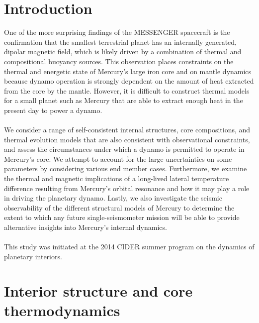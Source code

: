 \documentclass[landscape,a0b,final]{a0poster}
\begin{document}
\begin{multicols}{3}

\section*{Introduction}

One of the more surprising findings of the MESSENGER spacecraft is the confirmation that the smallest terrestrial planet has an internally generated, dipolar magnetic field, which is likely driven by a combination of thermal and compositional buoyancy sources. 
This observation places constraints on the thermal and energetic state of Mercury’s large iron core and on mantle dynamics because dynamo operation is strongly dependent on the amount of heat extracted from the core by the mantle.
However, it is difficult to construct thermal models for a small planet such as Mercury that are able to extract enough heat in the present day to power a dynamo. 
\\
\\
We consider a range of self-consistent internal structures, core compositions, and thermal evolution models that are also consistent with observational constraints, and assess the circumstances under which a dynamo is permitted to operate in Mercury’s core. 
We attempt to account for the large uncertainties on some parameters by considering various end member cases.
Furthermore, we examine the thermal and magnetic implications of a long-lived lateral temperature difference resulting from Mercury’s orbital resonance and how it may play a role in driving the planetary dynamo. 
Lastly, we also investigate the seismic observability of the different structural models of Mercury to determine the extent to which any future single-seismometer mission will be able to provide alternative insights into Mercury's internal dynamics.
\\
\\
This study was initiated at the 2014 CIDER summer program on the dynamics of planetary interiors.


\section*{Interior structure and core thermodynamics}


\end{multicols}
\end{document}
